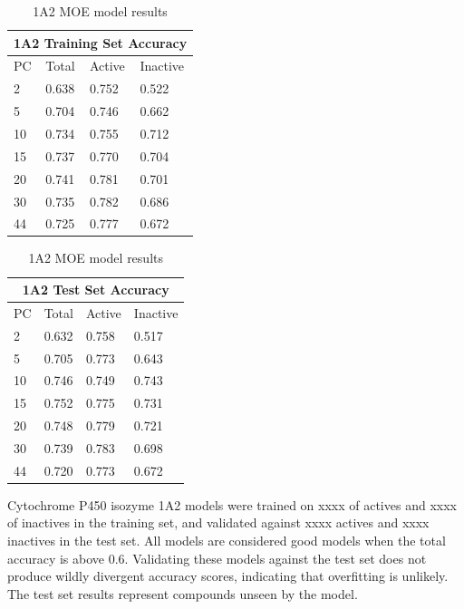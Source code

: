 \begin{table}[!h]
\begin{minipage}{.5\linewidth}
\centering
\begin{tabular}{|l|l|l|l|}
\hline
\multicolumn{4}{|c|}{1A2 Training Set Accuracy}   \\ \hline
PC & Total          & Active          & Inactive  \\ \hline
2  & 0.638          & 0.752           & 0.522     \\ \hline
5  & 0.704          & 0.746           & 0.662     \\ \hline
10 & 0.734          & 0.755           & 0.712     \\ \hline
15 & 0.737          & 0.770           & 0.704     \\ \hline
20 & 0.741          & 0.781           & 0.701     \\ \hline
30 & 0.735          & 0.782           & 0.686     \\ \hline
44 & 0.725          & 0.777           & 0.672     \\ \hline
\end{tabular}
\end{minipage}
\begin{minipage}{.5\linewidth}
\centering
\begin{tabular}{|l|l|l|l|}
\hline
\multicolumn{4}{|c|}{1A2 Test Set Accuracy}     \\ \hline
PC & Total          & Active          & Inactive \\ \hline
2  & 0.632          & 0.758           & 0.517   \\ \hline
5  & 0.705          & 0.773           & 0.643   \\ \hline
10 & 0.746          & 0.749           & 0.743   \\ \hline
15 & 0.752          & 0.775           & 0.731   \\ \hline
20 & 0.748          & 0.779           & 0.721   \\ \hline
30 & 0.739          & 0.783           & 0.698   \\ \hline
44 & 0.720          & 0.773           & 0.672   \\ \hline
\end{tabular}
\end{minipage}
\caption{1A2 MOE model results}
\end{table}

Cytochrome P450 isozyme 1A2 models were trained on xxxx of actives and xxxx of inactives in the training set, and validated against xxxx actives and xxxx inactives in the test set. All models are considered good models when the total accuracy is above 0.6. Validating these models against the test set does not produce wildly divergent accuracy scores, indicating that overfitting is unlikely. The test set results represent compounds unseen by the model. 

